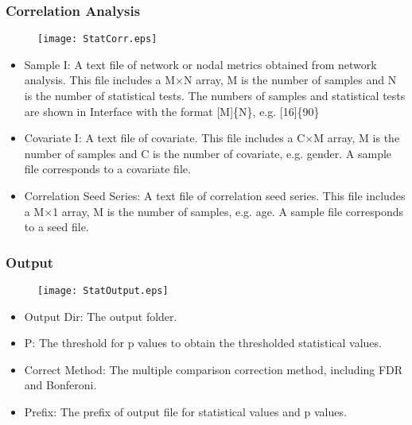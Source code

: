 \documentclass[11pt]{article}
\begin{document}
            \subsubsection{Correlation Analysis}
				\begin{figure}
					\begin{center}
						\texttt{[image: StatCorr.eps]}
					\end{center}
				\end{figure}
                \begin{itemize}
                    \item Sample I: A text file of network or nodal
                        metrics obtained from network analysis. This file
                        includes a M$\times$N array, M is the number of
                        samples and N is the number of statistical tests.
                        The numbers of samples and statistical tests are
                        shown in Interface with the format [M]\{N\}, 
                        e.g. [16]\{90\}
                    \item Covariate I: A text file of covariate. This file
                        includes a C$\times$M array, M is the number of 
                        samples and C is the number of covariate, e.g. 
                        gender. A sample file 
                        corresponds to a covariate file.
                    \item Correlation Seed Series: A text file of correlation
                        seed series. This file
                        includes a M$\times$1 array, M is the number of 
                        samples, e.g. age. A sample file 
                        corresponds to a seed file.
                \end{itemize}
            \subsubsection{Output}
				\begin{figure}
					\begin{center}
						\texttt{[image: StatOutput.eps]}
					\end{center}
				\end{figure}
                \begin{itemize}
                    \item Output Dir: The output folder.
                    \item P: The threshold for p values to obtain the thresholded 
                        statistical values.
                    \item Correct Method: The multiple comparison correction method, 
                        including FDR and Bonferoni.
                    \item Prefix: The prefix of output file for statistical 
                        values and p values.
                \end{itemize}
\end{document}
